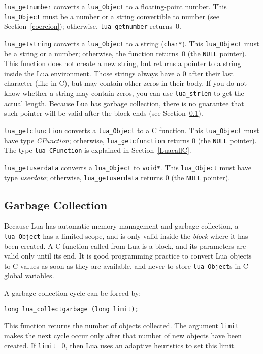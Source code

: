 \documentclass[11pt]{article}
\newcommand{\See}[1]{Section~\ref{#1}}
\newcommand{\see}[1]{(see \See{#1})}
\newcommand{\Deffunc}[1]{\index{#1}}
\begin{document}
\verb|lua_getnumber| converts a \verb|lua_Object| to a floating-point number.
This \verb|lua_Object| must be a number or a string convertible to number
\see{coercion}; otherwise, \verb|lua_getnumber| returns~0.

\verb|lua_getstring| converts a \verb|lua_Object| to a string (\verb|char*|).
This \verb|lua_Object| must be a string or a number;
otherwise, the function returns~0 (the \verb|NULL| pointer).
This function does not create a new string,
but returns a pointer to a string inside the Lua environment.
Those strings always have a 0 after their last character (like in C),
but may contain other zeros in their body.
If you do not know whether a string may contain zeros,
you can use \verb|lua_strlen| to get the actual length.
Because Lua has garbage collection,
there is no guarantee that such pointer will be valid after the block ends
\see{GC}.

\verb|lua_getcfunction| converts a \verb|lua_Object| to a C function.
This \verb|lua_Object| must have type \emph{CFunction};
otherwise, \verb|lua_getcfunction| returns 0 (the \verb|NULL| pointer).
The type \verb|lua_CFunction| is explained in \See{LuacallC}.

\verb|lua_getuserdata| converts a \verb|lua_Object| to \verb|void*|.
This \verb|lua_Object| must have type \emph{userdata};
otherwise, \verb|lua_getuserdata| returns 0 (the \verb|NULL| pointer).

\subsection{Garbage Collection}\label{GC}
Because Lua has automatic memory management and garbage collection,
a \verb|lua_Object| has a limited scope,
and is only valid inside the \emph{block} where it has been created.
A C function called from Lua is a block,
and its parameters are valid only until its end.
It is good programming practice to convert Lua objects to C values
as soon as they are available,
and never to store \verb|lua_Object|s in C global variables.

A garbage collection cycle can be forced by:
\Deffunc{lua_collectgarbage}
\begin{verbatim}
long lua_collectgarbage (long limit);
\end{verbatim}
This function returns the number of objects collected.
The argument \verb|limit| makes the next cycle occur only
after that number of new objects have been created.
If \verb|limit|=0, then Lua uses an adaptive heuristics to set this limit.
\end{document}
